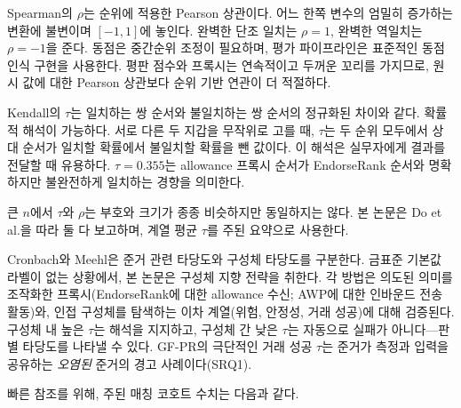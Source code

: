 
Spearman의 $\rho$는 순위에 적용한 Pearson 상관이다. 어느 한쪽 변수의 엄밀히 증가하는 변환에 불변이며 $[-1,1]$에 놓인다. 완벽한 단조 일치는 $\rho=1$, 완벽한 역일치는 $\rho=-1$을 준다. 동점은 중간순위 조정이 필요하며, 평가 파이프라인은 표준적인 동점 인식 구현을 사용한다. 평판 점수와 프록시는 연속적이고 두꺼운 꼬리를 가지므로, 원시 값에 대한 Pearson 상관보다 순위 기반 연관이 더 적절하다\citep{16}.


Kendall의 $\tau$는 일치하는 쌍 순서와 불일치하는 쌍 순서의 정규화된 차이와 같다. 확률적 해석이 가능하다. 서로 다른 두 지갑을 무작위로 고를 때, $\tau$는 두 순위 모두에서 상대 순서가 일치할 확률에서 불일치할 확률을 뺀 값이다\citep{36}. 이 해석은 실무자에게 결과를 전달할 때 유용하다. $\tau=0.355$는 allowance 프록시 순서가 EndorseRank 순서와 명확하지만 불완전하게 일치하는 경향을 의미한다.

큰 $n$에서 $\tau$와 $\rho$는 부호와 크기가 종종 비슷하지만 동일하지는 않다. 본 논문은 Do et al.\citep{16}을 따라 둘 다 보고하며, 계열 평균 $\tau$를 주된 요약으로 사용한다.


Cronbach와 Meehl\citep{14}은 준거 관련 타당도와 구성체 타당도를 구분한다. 금표준 기본값 라벨이 없는 상황에서, 본 논문은 구성체 지향 전략을 취한다. 각 방법은 의도된 의미를 조작화한 프록시(EndorseRank에 대한 allowance 수신; AWP에 대한 인바운드 전송 활동)와, 인접 구성체를 탐색하는 이차 계열(위험, 안정성, 거래 성공)에 대해 검증된다. 구성체 내 높은 $\tau$는 해석을 지지하고, 구성체 간 낮은 $\tau$는 자동으로 실패가 아니다---판별 타당도를 나타낼 수 있다. GF-PR의 극단적인 거래 성공 $\tau$는 준거가 측정과 입력을 공유하는 \emph{오염된} 준거의 경고 사례이다(SRQ1).


빠른 참조를 위해, 주된 매칭 코호트 수치는 다음과 같다.

